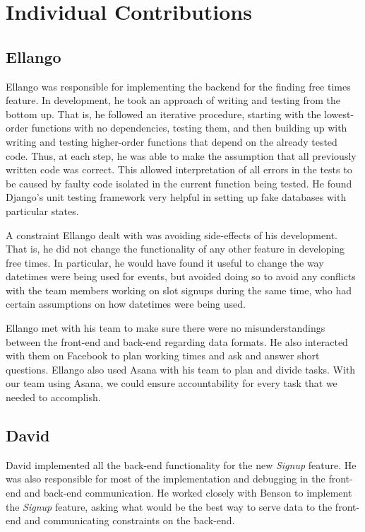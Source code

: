 \documentclass[a4paper]{article}
\begin{document}
\section{Individual Contributions}
\subsection{Ellango}
Ellango was responsible for implementing the backend for the finding free times feature. In development, he took an approach of writing and testing from the bottom up. That is, he followed an iterative procedure, starting with the lowest-order functions with no dependencies, testing them, and then building up with writing and testing higher-order functions that depend on the already tested code. Thus, at each step, he was able to make the assumption that all previously written code was correct. This allowed interpretation of all errors in the tests to be caused by faulty code isolated in the current function being tested. He found Django's unit testing framework very helpful in setting up fake databases with particular states.

A constraint Ellango dealt with was avoiding side-effects of his development. That is, he did not change the functionality of any other feature in developing free times. In particular, he would have found it useful to change the way datetimes were being used for events, but avoided doing so to avoid any conflicts with the team members working on slot signups during the same time, who had certain assumptions on how datetimes were being used.

Ellango met with his team to make sure there were no misunderstandings between the front-end and back-end regarding data formats. He also interacted with them on Facebook to plan working times and ask and answer short questions. Ellango also used Asana with his team to plan and divide tasks. With our team using Asana, we could ensure accountability for every task that we needed to accomplish.

\subsection{David}
David implemented all the back-end functionality for the new \emph{Signup} feature. He was also responsible for most of the implementation and debugging in the front-end and back-end communication. He worked closely with Benson to implement the \emph{Signup} feature, asking what would be the best way to serve data to the front-end and communicating constraints on the back-end.
\end{document}
